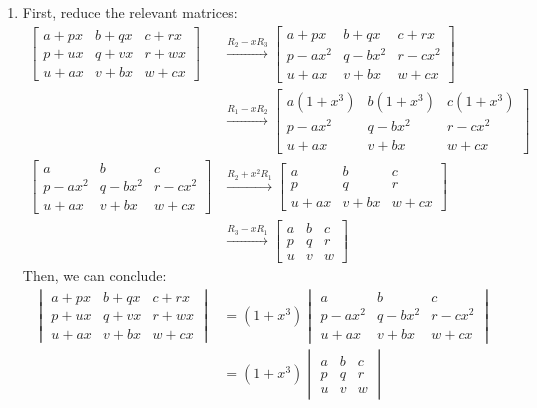 \documentclass[12pt, a4paper]{article}
\begin{document}
\begin{enumerate}[Q\arabic*.]
  \item First, reduce the relevant matrices:
    \begin{align*}
      \begin{bmatrix}
        a+px & b+qx & c+rx\\
        p+ux & q+vx & r+wx\\
        u+ax & v+bx & w+cx
      \end{bmatrix}&\xrightarrow{R_2-xR_3}
      \begin{bmatrix}
        a+px & b+qx & c+rx\\
        p-ax^2 & q-bx^2 & r-cx^2\\
        u+ax & v+bx & w+cx
      \end{bmatrix}\\&\xrightarrow{R_1-xR_2}
      \begin{bmatrix}
        a(1+x^3) & b(1+x^3) & c(1+x^3)\\
        p-ax^2 & q-bx^2 & r-cx^2\\
        u+ax & v+bx & w+cx
      \end{bmatrix}\\
      \begin{bmatrix}
        a & b & c\\
        p-ax^2 & q-bx^2 & r-cx^2\\
        u+ax & v+bx & w+cx
      \end{bmatrix}&\xrightarrow{R_2+x^2R_1}
      \begin{bmatrix}
        a & b & c\\
        p & q & r\\
        u+ax & v+bx & w+cx
      \end{bmatrix}\\&\xrightarrow{R_3-xR_1}
      \begin{bmatrix}
        a & b & c\\
        p & q & r\\
        u & v & w
      \end{bmatrix}
    \end{align*}
    Then, we can conclude:
    \begin{align*}
      \begin{vmatrix}
        a+px & b+qx & c+rx\\
        p+ux & q+vx & r+wx\\
        u+ax & v+bx & w+cx
      \end{vmatrix}&=
      (1+x^3)
      \begin{vmatrix}
        a & b & c\\
        p-ax^2 & q-bx^2 & r-cx^2\\
        u+ax & v+bx & w+cx
      \end{vmatrix}\\ &=
      (1+x^3)
      \begin{vmatrix}
        a & b & c\\
        p & q & r\\
        u & v & w
      \end{vmatrix}
    \end{align*}


\end{enumerate}
\end{document}
